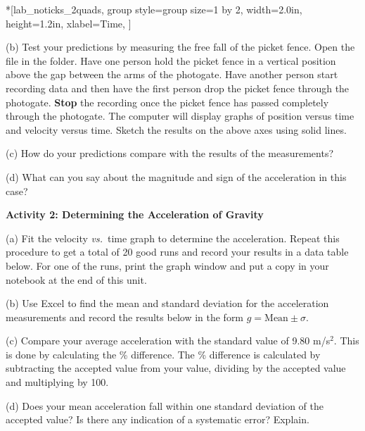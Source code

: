 \begin{lab_groupplot}*{}[lab_noticks_2quads,
	group style={group size=1 by 2},
	width=2.0in,  height=1.2in,
	xlabel=Time,
	]
\nextgroupplot[
	lab_noticks_1quad,
	ylabel=Position,
	ylabel_align={0},
	]
\nextgroupplot[
	ylabel=Velocity,
	plus_minus_zero_labels,
	]
\end{lab_groupplot}

(b) Test your predictions by measuring the free fall of the picket fence. Open
the file  in the \filename{\coursefolder} folder. 
Have one person hold the picket fence in a vertical
position above the gap between the arms of the photogate. Have another person
start recording data and then have the first person drop the picket fence through
the photogate. \textbf{Stop} the recording once the picket fence has passed
completely through the photogate. The computer will display graphs of position
versus time and velocity versus time. Sketch the results on the above axes using
solid lines.

(c) How do your predictions compare with the results of the measurements?
\vspace{20mm}

(d) What can you say about the magnitude and sign of the acceleration in this
case?
\vspace{20mm}

\textbf{Activity 2: Determining the Acceleration of Gravity }

(a) Fit the velocity \textit{vs.}~time graph to determine the acceleration. Repeat this
procedure to get a total of 20 good runs and record your results in a data table
below. For one of the runs, print the graph window and put a copy in your notebook
at the end of this unit.
\vspace{50mm}

(b) Use Excel to find the mean and standard deviation for the acceleration
measurements and record the results below in the form $g = \mbox{Mean}
\pm \sigma$.
\vspace{10mm}

(c) Compare your average acceleration with the standard value of 9.80 m/s\( ^{2} \).
This is done by calculating the \% difference. The \% difference is calculated
by subtracting the accepted value from your value, dividing by the accepted
value and multiplying by 100.
\vspace{20mm}

(d) Does your mean acceleration fall within one standard deviation of the accepted
value? Is there any indication of a systematic error? Explain.

